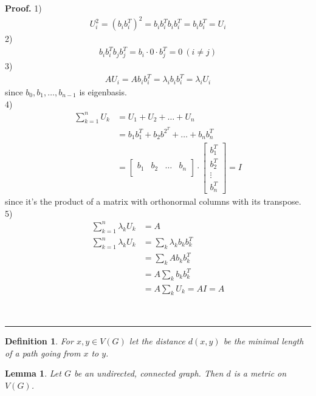 \documentclass[12pt]{article}%
\newtheorem{definition}[theorem]{Definition}
\newtheorem{lemma}[theorem]{Lemma}
\newenvironment{proof}[1][Proof]{\textbf{#1.} }{\ \rule{0.5em}{0.5em}}
\begin{document}
\begin{proof}
1) 
\begin{align}
    U_i^2 = (b_i b_i^T)^2 = b_i b_i^T b_i b_i^T = b_i b_i^T = U_i
\end{align}
2)
\begin{align}
    b_i b_i^T b_j b_j^T = b_i \cdot 0 \cdot b_j^T = 0 \ (i \neq j)
\end{align}
3)
\begin{align}
    A U_i = A b_i b_i^T = \lambda_i b_i b_i^T = \lambda_i U_i
\end{align}
since $b_0, b_1, \ldots, b_{n-1}$ is eigenbasis.\\
4)
\begin{align}
    \sum_{k=1}^n U_k &= U_1 + U_2 + \ldots + U_n\\
    &= b_1 b_1^T + b_2 b^2^T + \ldots + b_n b_n^T\\
    &=
    \begin{bmatrix}
        b_1 & b_2 & \ldots & b_n\\
    \end{bmatrix} \cdot
    \begin{bmatrix}
        b_1^T\\
        b_2^T\\
        \vdots\\
        b_n^T
    \end{bmatrix} = I
\end{align}
since it's the product of a matrix with orthonormal columns with its transpose.\\
5)
\begin{align}
    \sum_{k=1}^n \lambda_k U_k &= A\\
    \sum_{k=1}^n \lambda_k U_k &= \sum_k \lambda_k b_k b_k^T\\
    &= \sum_k A b_k b_k^T\\
    &= A \sum_k b_k b_k^T\\
    &= A \sum_k U_k
    = A I
    = A
\end{align}


\end{proof}


\begin{definition}
For $x,y\in V(G)$ let the \emph{distance} $d(x,y)$ be the minimal length of
a path going from $x$ to $y$. 
\end{definition}

\begin{lemma}
Let $G$ be an undirected, connected graph. Then $d$ is a metric on $V(G)$. 
\end{lemma}
\end{document}
